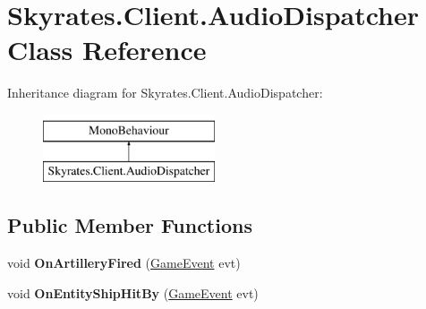 \hypertarget{class_skyrates_1_1_client_1_1_audio_dispatcher}{\section{Skyrates.\-Client.\-Audio\-Dispatcher Class Reference}
\label{class_skyrates_1_1_client_1_1_audio_dispatcher}
}
Inheritance diagram for Skyrates.\-Client.\-Audio\-Dispatcher\-:\begin{figure}[H]
\begin{center}
\leavevmode
\includegraphics[height=2.000000cm]{class_skyrates_1_1_client_1_1_audio_dispatcher}
\end{center}
\end{figure}
\subsection*{Public Member Functions}
\begin{DoxyCompactItemize}
\item 
\hypertarget{class_skyrates_1_1_client_1_1_audio_dispatcher_a3f32fc26138cfdd53c00b9c5f7e46e4f}{void {\bfseries On\-Artillery\-Fired} (\hyperlink{class_skyrates_1_1_client_1_1_game_1_1_event_1_1_game_event}{Game\-Event} evt)}\label{class_skyrates_1_1_client_1_1_audio_dispatcher_a3f32fc26138cfdd53c00b9c5f7e46e4f}

\item 
\hypertarget{class_skyrates_1_1_client_1_1_audio_dispatcher_a1edd4fbe4c6b030ba5f8c92ec9d46a9b}{void {\bfseries On\-Entity\-Ship\-Hit\-By} (\hyperlink{class_skyrates_1_1_client_1_1_game_1_1_event_1_1_game_event}{Game\-Event} evt)}\label{class_skyrates_1_1_client_1_1_audio_dispatcher_a1edd4fbe4c6b030ba5f8c92ec9d46a9b}

\end{DoxyCompactItemize}
